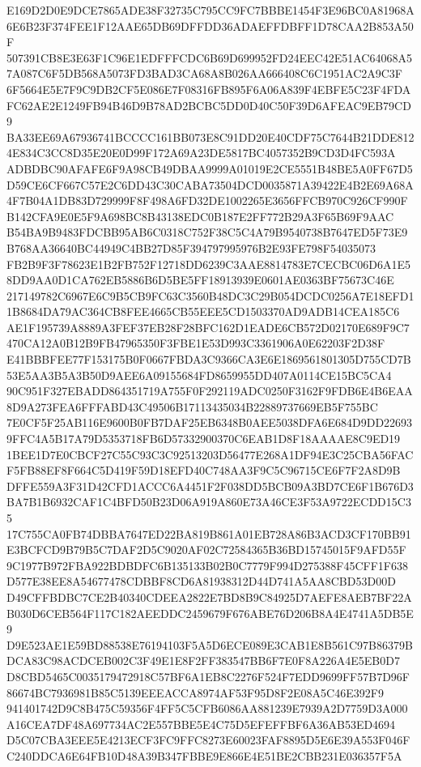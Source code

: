 \documentclass[UTF8,fontset=fandol,zihao=-4,a4paper]{ctexart}
\begin{document}
{{E169D2D0E9DCE7865ADE38F32735C795CC9FC7BBBE1454F3E96BC0A81968A6E6B23F374FEE1F12AAE65DB69DFFDD36ADAEFFDBFF1D78CAA2B853A50F
507391CB8E3E63F1C96E1EDFFFCDC6B69D699952FD24EEC42E51AC64068A57A087C6F5DB568A5073FD3BAD3CA68A8B026AA666408C6C1951AC2A9C3F
6F5664E5E7F9C9DB2CF5E086E7F08316FB895F6A06A839F4EBFE5C23F4FDAFC62AE2E1249FB94B46D9B78AD2BCBC5DD0D40C50F39D6AFEAC9EB79CD9
BA33EE69A67936741BCCCC161BB073E8C91DD20E40CDF75C7644B21DDE8124E834C3CC8D35E20E0D99F172A69A23DE5817BC4057352B9CD3D4FC593A
ADBDBC90AFAFE6F9A98CB49DBAA9999A01019E2CE5551B48BE5A0FF67D5D59CE6CF667C57E2C6DD43C30CABA73504DCD0035871A39422E4B2E69A68A
4F7B04A1DB83D729999F8F498A6FD32DE1002265E3656FFCB970C926CF990FB142CFA9E0E5F9A698BC8B43138EDC0B187E2FF772B29A3F65B69F9AAC
B54BA9B9483FDCBB95AB6C0318C752F38C5C4A79B9540738B7647ED5F73E9B768AA36640BC44949C4BB27D85F394797995976B2E93FE798F54035073
FB2B9F3F78623E1B2FB752F12718DD6239C3AAE8814783E7CECBC06D6A1E58DD9AA0D1CA762EB5886B6D5BE5FF18913939E0601AE0363BF75673C46E
217149782C6967E6C9B5CB9FC63C3560B48DC3C29B054DCDC0256A7E18EFD11B8684DA79AC364CB8FEE4665CB55EEE5CD1503370AD9ADB14CEA185C6
AE1F195739A8889A3FEF37EB28F28BFC162D1EADE6CB572D02170E689F9C7470CA12A0B12B9FB47965350F3FBE1E53D993C3361906A0E62203F2D38F
E41BBBFEE77F153175B0F0667FBDA3C9366CA3E6E1869561801305D755CD7B53E5AA3B5A3B50D9AEE6A09155684FD8659955DD407A0114CE15BC5CA4
90C951F327EBADD864351719A755F0F292119ADC0250F3162F9FDB6E4B6EAA8D9A273FEA6FFFABD43C49506B17113435034B22889737669EB5F755BC
7E0CF5F25AB116E9600B0FB7DAF25EB6348B0AEE5038DFA6E684D9DD226939FFC4A5B17A79D5353718FB6D57332900370C6EAB1D8F18AAAAE8C9ED19
1BEE1D7E0CBCF27C55C93C3C92513203D56477E268A1DF94E3C25CBA56FACF5FB88EF8F664C5D419F59D18EFD40C748AA3F9C5C96715CE6F7F2A8D9B
DFFE559A3F31D42CFD1ACCC6A4451F2F038DD5BCB09A3BD7CE6F1B676D3BA7B1B6932CAF1C4BFD50B23D06A919A860E73A46CE3F53A9722ECDD15C35
17C755CA0FB74DBBA7647ED22BA819B861A01EB728A86B3ACD3CF170BB91E3BCFCD9B79B5C7DAF2D5C9020AF02C72584365B36BD15745015F9AFD55F
9C1977B972FBA922BDBDFC6B135133B02B0C7779F994D275388F45CFF1F638D577E38EE8A54677478CDBBF8CD6A81938312D44D741A5AA8CBD53D00D
D49CFFBDBC7CE2B40340CDEEA2822E7BD8B9C84925D7AEFE8AEB7BF22AB030D6CEB564F117C182AEEDDC2459679F676ABE76D206B8A4E4741A5DB5E9
D9E523AE1E59BD88538E76194103F5A5D6ECE089E3CAB1E8B561C97B86379BDCA83C98ACDCEB002C3F49E1E8F2FF383547BB6F7E0F8A226A4E5EB0D7
D8CBD5465C0035179472918C57BF6A1EB8C2276F524F7EDD9699FF57B7D96F86674BC7936981B85C5139EEEACCA8974AF53F95D8F2E08A5C46E392F9
941401742D9C8B475C59356F4FF5C5CFB6086AA881239E7939A2D7759D3A000A16CEA7DF48A697734AC2E557BBE5E4C75D5EFEFFBF6A36AB53ED4694
D5C07CBA3EEE5E4213ECF3FC9FFC8273E60023FAF8895D5E6E39A553F046FC240DDCA6E64FB10D48A39B347FBBE9E866E4E51BE2CBB231E036357F5A
}}
\end{document}
